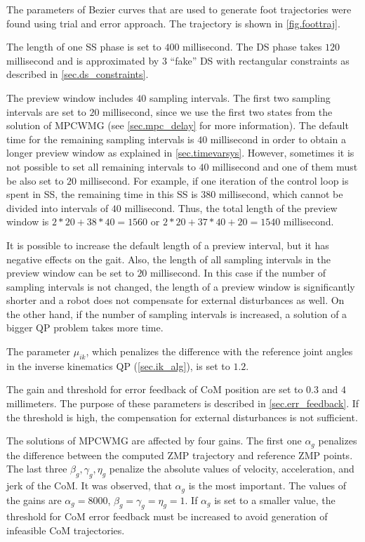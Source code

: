 The parameters of Bezier curves that are used to generate foot trajectories were
found using trial and error approach. The trajectory is shown in \cref{fig.foottraj}.

The length of one \ac{SS} phase is set to $400$ millisecond. The \ac{DS} phase
takes $120$ millisecond and is approximated by $3$ ``fake'' \ac{DS} with rectangular
constraints as described in \cref{sec.ds_constraints}.

The preview window includes $40$ sampling intervals. The first two sampling
intervals are set to $20$ millisecond, since we use the first two states from
the solution of \ac{MPCWMG} (see \cref{sec.mpc_delay} for more information).
The default time for the remaining sampling intervals is $40$ millisecond 
in order to obtain a longer preview window as explained in \cref{sec.timevarsys}.
However, sometimes it is not possible to set all remaining intervals to $40$
millisecond and one of them must be also set to $20$ millisecond. For example,
if one iteration of the control loop is spent in \ac{SS}, the remaining time in
this \ac{SS} is $380$ millisecond, which cannot be divided into intervals of $40$
millisecond. Thus, the total length of the preview window is $2*20 + 38*40 = 1560$ 
or $2*20 + 37*40 + 20 = 1540$ millisecond. 

It is possible to increase the default length of a preview interval, but it has 
negative effects on the gait. Also, the length of all sampling intervals in the
preview window can be set to $20$ millisecond. In this case if the number of 
sampling intervals is not changed, the length of a preview window is significantly 
shorter and a robot does not compensate for external disturbances as well. On the 
other hand, if the number of sampling intervals is increased, a solution of a 
bigger \ac{QP} problem takes more time.

The parameter $\mu_{ik}$, which penalizes the difference with the reference joint
angles in the inverse kinematics \ac{QP} (\cref{sec.ik_alg}), is set to $1.2$.

The gain and threshold for error feedback of \ac{CoM} position are set to $0.3$ 
and $4$ millimeters. The purpose of these parameters is described in 
\cref{sec.err_feedback}. If the threshold is high, the compensation for external
disturbances is not sufficient. 

The solutions of \ac{MPCWMG} are affected by four gains. The first one $\alpha_g$ 
penalizes the difference between the computed \ac{ZMP} trajectory and reference 
\ac{ZMP} points. The last three $\beta_g, \gamma_g, \eta_g$ penalize the absolute
values of velocity, acceleration, and jerk of the \ac{CoM}. It was observed, that 
$\alpha_g$ is the most important. The values of the gains are $\alpha_g = 8000$,
$\beta_g = \gamma_g = \eta_g = 1$. If $\alpha_g$ is set to a smaller value, the 
threshold for \ac{CoM} error feedback must be increased to avoid generation of 
infeasible \ac{CoM} trajectories. 



